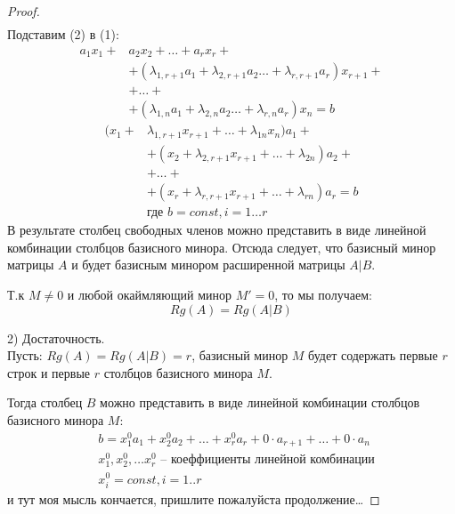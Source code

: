 \begin{proof}
\begin{gather*}
  \end{gather*}
  Подставим (2) в (1):
  \begin{align*}
    a_1 x_1 + &a_2 x_2 + \ldots + a_r x_r + \\
            &+ (\lambda_{1,r+1} a_1 + \lambda_{2,r+1} a_2 \ldots + \lambda_{r,r+1} a_r) x_{r+1} + \\
            &+ \ldots + \\
            &+ (\lambda_{1,n} a_1 + \lambda_{2,n} a_2 \ldots + \lambda_{r,n} a_r) x_{n} = b
  \end{align*}
  \begin{align*}
    (x_1 + &\lambda_{1,r+1} x_{r+1} + \ldots + \lambda_{1n} x_{n}) a_1 + \\
          &+ (x_2 + \lambda_{2,r+1} x_{r+1} + \ldots + \lambda_{2n}) a_2 + \\
          &+ \ldots + \\
          &+ (x_r + \lambda_{r,r+1} x_{r+1} + \ldots + \lambda_{rn}) a_r = b \\
          &\text{где } b = const, i=1 \ldots r
  \end{align*}
  В результате столбец свободных членов можно представить в виде линейной комбинации столбцов базисного минора. Отсюда следует, что базисный минор матрицы $A$ и будет базисным минором расширенной матрицы $A|B$.
  
  Т.к $M \neq 0$ и любой окаймляющий минор $M' = 0$, то мы получаем: \[
  Rg(A) = Rg(A|B)
  \] 

  2) Достаточность. \\
  Пусть: $Rg(A) = Rg(A|B) = r$, базисный минор $M$ будет содержать первые $r$ строк и первые  $r$ столбцов базисного минора $M$.
  
  Тогда столбец  $B$ можно представить в виде линейной комбинации столбцов базисного минора $M$:
  \begin{align*}
    &b = x_1^0 a_1 + x_2^0 a_2 + \ldots + x_r^0 a_r + 0 \cdot a_{r+1} + \ldots + 0 \cdot a_n \\
    &x_1^0, x_2^0, \ldots x_r^0 \text{ -- коеффициенты линейной комбинации} \\
    &x_i^0 = const, i=1..r
  \end{align*}
  и тут моя мысль кончается, пришлите пожалуйста продолжение\ldots
\end{proof}

